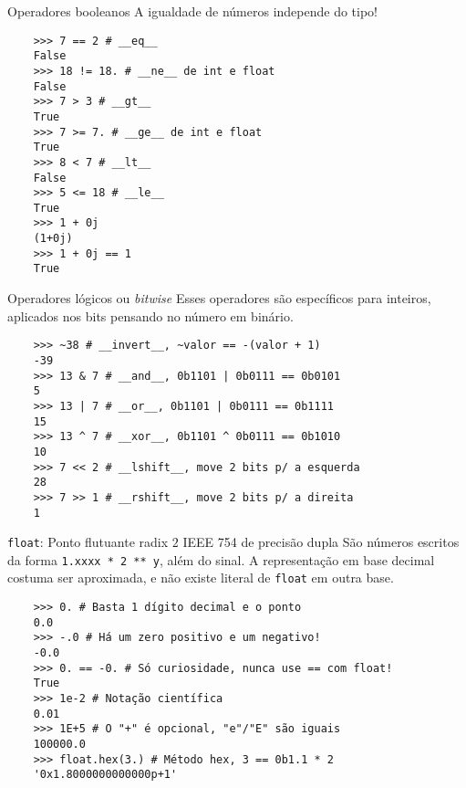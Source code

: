 \documentclass[utf8]{beamer}
\begin{document}
\begin{frame}[fragile]{Operadores booleanos}
  A igualdade de números independe do tipo!

  \begin{verbatim}
    >>> 7 == 2 # __eq__
    False
    >>> 18 != 18. # __ne__ de int e float
    False
    >>> 7 > 3 # __gt__
    True
    >>> 7 >= 7. # __ge__ de int e float
    True
    >>> 8 < 7 # __lt__
    False
    >>> 5 <= 18 # __le__
    True
    >>> 1 + 0j
    (1+0j)
    >>> 1 + 0j == 1
    True
  \end{verbatim}

\end{frame}


\begin{frame}[fragile]{Operadores lógicos ou \emph{bitwise}}
  Esses operadores são específicos para inteiros,
  aplicados nos bits pensando no número em binário.

  \begin{verbatim}
    >>> ~38 # __invert__, ~valor == -(valor + 1)
    -39
    >>> 13 & 7 # __and__, 0b1101 | 0b0111 == 0b0101
    5
    >>> 13 | 7 # __or__, 0b1101 | 0b0111 == 0b1111
    15
    >>> 13 ^ 7 # __xor__, 0b1101 ^ 0b0111 == 0b1010
    10
    >>> 7 << 2 # __lshift__, move 2 bits p/ a esquerda
    28
    >>> 7 >> 1 # __rshift__, move 2 bits p/ a direita
    1
  \end{verbatim}

\end{frame}


\begin{frame}[fragile]{\texttt{float}:
                       Ponto flutuante radix $2$
                       IEEE 754 de precisão dupla}
  São números escritos da forma \texttt{1.xxxx * 2 ** y},
  além do sinal.
  A representação em base decimal costuma ser aproximada,
  e não existe literal de \texttt{float} em outra base.

  \begin{verbatim}
    >>> 0. # Basta 1 dígito decimal e o ponto
    0.0
    >>> -.0 # Há um zero positivo e um negativo!
    -0.0
    >>> 0. == -0. # Só curiosidade, nunca use == com float!
    True
    >>> 1e-2 # Notação científica
    0.01
    >>> 1E+5 # O "+" é opcional, "e"/"E" são iguais
    100000.0
    >>> float.hex(3.) # Método hex, 3 == 0b1.1 * 2
    '0x1.8000000000000p+1'
  \end{verbatim}

\end{frame}
\end{document}
